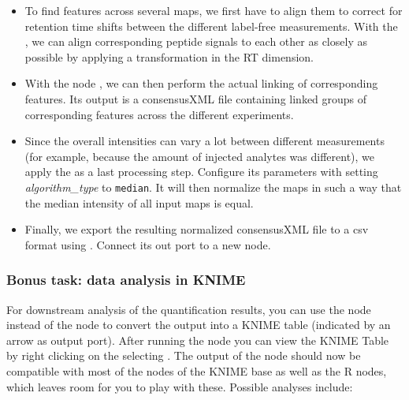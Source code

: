 \begin{itemize}
    \item To find features across several maps, we first have to align them to correct for retention time shifts between the different label-free measurements. With the  , we can align corresponding peptide signals to each other as closely as possible by applying a transformation in the RT dimension. 
    \item With the  node , we can then perform the actual linking of corresponding features. Its output is a consensusXML file containing linked groups of corresponding features across the different experiments.
    \item Since the overall intensities can vary a lot between different measurements (for example, because the amount of injected analytes was different), we apply the   as a last processing step. Configure its parameters with setting \textit{algorithm\_type} to \texttt{median}. It will then normalize the maps in such a way that the median intensity of all input maps is equal.
    \item Finally, we export the resulting normalized consensusXML file to a csv format using  . Connect its out port to a new  node.
\end{itemize}

\subsubsection{Bonus task: data analysis in KNIME}

For downstream analysis of the quantification results, you can use the  node instead of the  node to convert the output into a KNIME table (indicated by an arrow as output port). 
After running the node you can view the KNIME Table by right clicking on the  selecting . 
The output of the node should now be compatible with most of the nodes of the KNIME base as well as the R nodes, which leaves room for you to play with these.
Possible analyses include:

